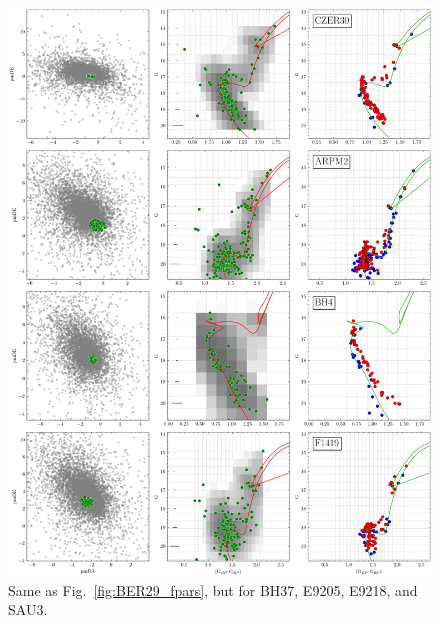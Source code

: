 \documentclass{aa}
\begin{document}
\begin{appendix}
 \begin{figure}
  \centering
  \includegraphics[height=.95\textheight]{figs/8_fpars.png}
  \caption{Same as Fig.~\ref{fig:BER29_fpars}, but  for BH37, E9205, E9218, and SAU3.}
  \label{fig:12fpars}
 \end{figure}


\end{appendix}
\end{document}
